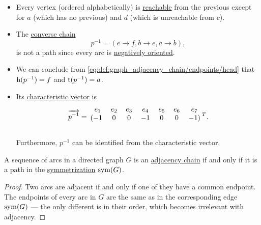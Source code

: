 \begin{example}
\begin{itemize}
    \item Every vertex (ordered alphabetically) is \hyperref[def:graph_directed_path/reachability]{reachable} from the previous except for \( a \) (which has no previous) and \( d \) (which is unreachable from \( c \)).

    \item The \hyperref[def:graph_adjacency_chain/converse]{converse chain}
    \begin{equation*}
      p^{-1} = (e \to f, b \to e, a \to b),
    \end{equation*}
    is not a path since every arc is \hyperref[def:graph_adjacency_chain/orientation]{negatively oriented}.

    \item We can conclude from \eqref{eq:def:graph_adjacency_chain/endpoints/head} that \( \operatorname{h}(p^{-1}) = f \) and \( \operatorname{t}(p^{-1}) = a \).

    \item Its \hyperref[def:graph_directed_path/characteristic_vector]{characteristic vector} is
    \begin{equation*}
      \vect{p^{-1}}
      =
      \begin{blockarray}{ccccccrl}
        e_1 & e_2 & e_3 & e_4 & e_5 & e_6 & e_7 \\
      \begin{block}{(ccccccr)l}
        -1  & 0   & 0   & -1  & 0   & 0   & -1 \\
      \end{block}
      \end{blockarray}
      {}^T.
    \end{equation*}

    Furthermore, \( p^{-1} \) can be identified from the characteristic vector.
  \end{itemize}
\end{example}

\begin{proposition}\label{thm:graph_chain_symmetrization}
  A sequence of arcs in a directed graph \( G \) is an \hyperref[def:graph_adjacency_chain]{adjacency chain} if and only if it is a path in the \hyperref[def:graph/symmetrization]{symmetrization} \( \operatorname{sym}(G) \).
\end{proposition}
\begin{proof}
  Two arcs are adjacent if and only if one of they have a common endpoint. The endpoints of every arc in \( G \) are the same as in the corresponding edge \( \operatorname{sym}(G) \) --- the only different is in their order, which becomes irrelevant with adjacency.
\end{proof}

